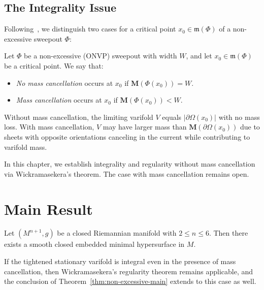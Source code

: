 \subsection{The Integrality Issue}\label{subsec:integrality-issue}

Following~\cite{CLS22}, we distinguish two cases for a critical point $x_0 \in \mathfrak{m}(\Phi)$ of a non-excessive sweepout $\Phi$:

\begin{definition}\label{def:mass-cancellation}
Let $\Phi$ be a non-excessive (ONVP) sweepout with width $W$, and let $x_0 \in \mathfrak{m}(\Phi)$ be a critical point. We say that:
\begin{itemize}
    \item \emph{No mass cancellation} occurs at $x_0$ if $\mathbf{M}(\Phi(x_0)) = W$.
    \item \emph{Mass cancellation} occurs at $x_0$ if $\mathbf{M}(\Phi(x_0)) < W$.
\end{itemize}
\end{definition}

Without mass cancellation, the limiting varifold $V$ equals $|\partial\Omega(x_0)|$ with no mass loss. With mass cancellation, $V$ may have larger mass than $\mathbf{M}(\partial\Omega(x_0))$ due to sheets with opposite orientations canceling in the current while contributing to varifold mass.

In this chapter, we establish integrality and regularity without mass cancellation via Wickramasekera's theorem. The case with mass cancellation remains open.



\section{Main Result}

\begin{theorem}\label{thm:non-excessive-main}
    Let $(M^{n+1}, g)$ be a closed Riemannian manifold with $2 \leq n \leq 6$. Then there exists a
    smooth closed embedded minimal hypersurface in $M$.
\end{theorem}

{\color{red}
\begin{conjecture}\label{conj:mass-cancellation-integrality}
    If the tightened stationary varifold is integral even in the presence of mass cancellation, then
    Wickramasekera's regularity theorem remains applicable, and the conclusion of
    Theorem~\ref{thm:non-excessive-main} extends to this case as well.
\end{conjecture}
}



